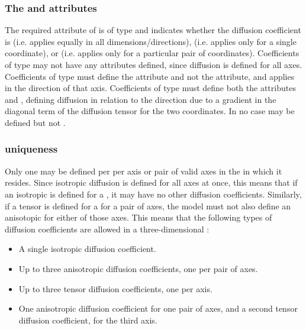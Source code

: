 \subsubsection{The \fixttspace{} and  attributes}
The required  attribute of \DiffusionCoefficient is of type  and indicates whether the diffusion coefficient is  (i.e. applies equally in all dimensions/directions),  (i.e. applies only for a single coordinate), or  (i.e. applies only for a particular pair of coordinates). Coefficients of type  may not have any  attributes defined, since diffusion is defined for all axes.  Coefficients of type  must define the  attribute and not the  attribute, and applies in the direction of that axis.  Coefficients of type  must define both the attributes  and , defining diffusion in relation to the direction due to a gradient in the diagonal term of the diffusion tensor for the two coordinates.  In no case may  be defined but not .

\subsubsection{ uniqueness}
Only one \DiffusionCoefficient may be defined per \Species per axis or pair of valid axes in the \Compartment in which it resides.  Since isotropic diffusion is defined for all axes at once, this means that if an isotropic \DiffusionCoefficient is defined for a \Species, it may have no other diffusion coefficients.  Similarly, if a tensor \DiffusionCoefficient is defined for a \Species for a pair of axes, the model must not also define an anisotopic \DiffusionCoefficient for either of those axes.  This means that the following types of diffusion coefficients are allowed in a three-dimensional \Geometry:
\begin{itemize}
  \item A single isotropic diffusion coefficient.
  \item Up to three anisotropic diffusion coefficients, one per pair of axes.
  \item Up to three tensor diffusion coefficients, one per axis.
  \item One anisotropic diffusion coefficient for one pair of axes, and a second tensor diffusion coefficient, for the third axis.
\end{itemize}

